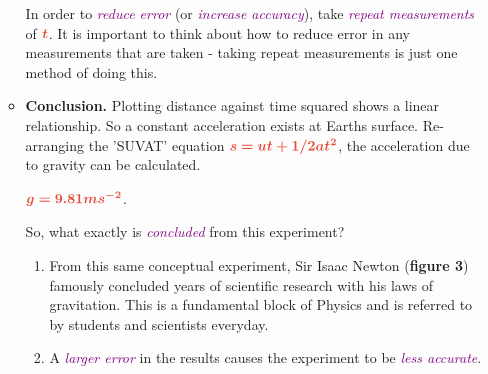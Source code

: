 \documentclass{article}
\begin{document}
\begin{tcolorbox}[colback=white,colbacktitle=dblue!75!white,colframe=dblue!75!white,title=\textbf{Science is creative! Here is an example.}]
\begin{enumerate}
\begin{itemize}
                In order to \emph{\textcolor{purple}{reduce error}} (or \emph{\textcolor{purple}{increase accuracy}}), take \emph{\textcolor{purple}{repeat measurements}} of $ \textcolor{red}{\boldsymbol{t}} $. It is important to think about how to reduce error in any measurements that are taken - taking repeat measurements is just one method of doing this.\\


                \item \textbf{Conclusion.} Plotting distance against time squared shows a linear relationship. So a constant acceleration exists at Earths surface. Re-arranging the 'SUVAT' equation $ \textcolor{red}{\boldsymbol{s = ut + 1/2 at^2}} $, the acceleration due to gravity can be calculated.
                
                    \begin{center}
                        $ \textcolor{red}{\boldsymbol{g=9.81ms^{-2}}} $.\\
                    \end{center}
                        
                So, what exactly is \emph{\textcolor{purple}{concluded}} from this experiment?
                
                    \renewcommand{\theenumi}{\roman{enumi}}
                    \begin{enumerate} 
                    
                        \item From this same conceptual experiment, Sir Isaac Newton (\textbf{figure 3}) famously concluded years of scientific research with his laws of gravitation. This is a fundamental block of Physics and is referred to by students and scientists everyday. 
                        
                        \item A \emph{\textcolor{purple}{larger error}} in the results causes the experiment to be \emph{\textcolor{purple}{less accurate}}.
                        
                    \end{enumerate} 
                    
                
            \end{itemize}
            
        \end{enumerate}
        
    \end{tcolorbox}
    
\end{document}
